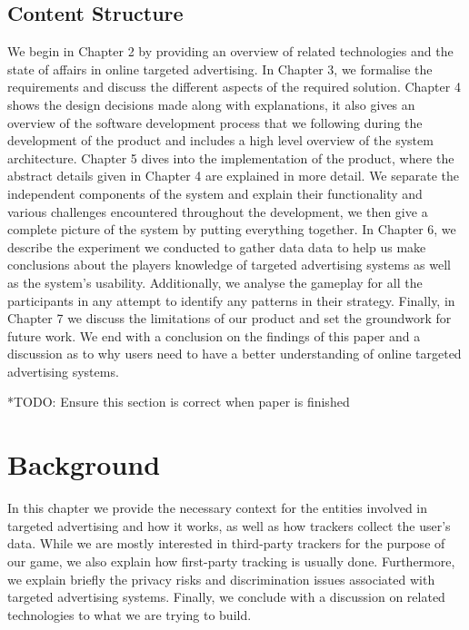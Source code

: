 \documentclass{l4proj}
\begin{document}
\section{Content Structure}
We begin in Chapter 2 by providing an overview of related technologies and the state of affairs in online targeted advertising. In Chapter 3, we formalise the requirements and discuss the different aspects of the required solution. Chapter 4 shows the design decisions made along with explanations, it also gives an overview of the software development process that we following during the development of the product and includes a high level overview of the system architecture. Chapter 5 dives into the implementation of the product, where the abstract details given in Chapter 4 are explained in more detail. We separate the independent components of the system and explain their functionality and various challenges encountered throughout the development, we then give a complete picture of the system by putting everything together. In Chapter 6, we describe the experiment we conducted to gather data data to help us make conclusions about the players knowledge of targeted advertising systems as well as the system's usability. Additionally, we analyse the gameplay for all the participants in any attempt to identify any patterns in their strategy. Finally, in Chapter 7 we discuss the limitations of our product and set the groundwork for future work. We end with a conclusion on the findings of this paper and a discussion as to why users need to have a better understanding of online targeted advertising systems.

*TODO: Ensure this section is correct when paper is finished

\chapter{Background}
In this chapter we provide the necessary context for the entities involved in targeted advertising and how it works, as well as how trackers collect the user's data. While we are mostly interested in third-party trackers for the purpose of our game, we also explain how first-party tracking is usually done. Furthermore, we explain briefly the privacy risks and discrimination issues associated with targeted advertising systems. Finally, we conclude with a discussion on related technologies to what we are trying to build.
\end{document}
